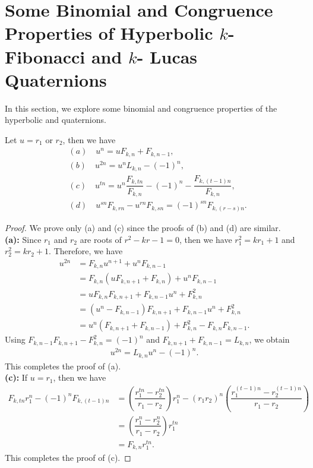 \section{{Some Binomial and Congruence Properties of Hyperbolic $k$- Fibonacci and $k$- Lucas Quaternions}}
In this section, we explore some binomial and congruence properties of the hyperbolic \kF\vspace{.5mm} and \kL\vspace{.5mm} quaternions.
\begin{lemma}
Let $u=r_{1}$ or $r_{2}$, then we have\label{3.1l}
\begin{align*}
&(a)\quad u^n=u{F}_{k,n}+{F}_{k,n-1},\\
&(b)\quad u^{2n}=u^n{L}_{k,n}-(-1)^n,\\
&(c)\quad u^{tn}=u^n\dfrac{{F}_{k,tn}}{{F}_{k,n}}-(-1)^n-\dfrac{{F}_{k,(t-1)n}}{{F}_{k,n}},\\
&(d)\quad u^{sn}{F}_{k,rn}-u^{rn}{F}_{k,sn}=(-1)^{sn}{F}_{k,(r-s)n}.
\end{align*}
\begin{proof}
We prove only (a) and (c) since the proofs of (b) and (d) are similar.\\
\textbf{{(a):}}
Since $r_1$ and $r_2$ are roots of $r^2-kr-1=0$, then we have $r_1^2=kr_1+1$ and $r_2^2=kr_2+1$. Therefore, we have
\begin{align*}
u^{2n}&={F}_{k,n}u^{n+1}+u^n{F}_{k,n-1}\\
&={F}_{k,n}(u{F}_{k,n+1}+{F}_{k,n})+u^n{F}_{k,n-1}\\
&=u{F}_{k,n}{F}_{k,n+1}+{F}_{k,n-1}u^n+{F}_{k,n}^2\\
&=(u^n-{F}_{k,n-1}){F}_{k,n+1}+{F}_{k,n-1}u^n+{F}_{k,n}^2\\
&=u^n({F}_{k,n+1}+{F}_{k,n-1})+{F}_{k,n}^2-{F}_{k,n}F_{k,n-1}.
\end{align*}
Using ${F}_{k,n-1}{F}_{k,n+1}-{F}_{k,n}^2=(-1)^n$ and ${F}_{k,n+1}+{F}_{k,n-1}={L}_{k,n}$, we obtain
\begin{align*}
u^{2n}={L}_{k,n}u^n-(-1)^n.
\end{align*}
This completes the proof of (a).\\
\textbf{{(c):}}
If $u=r_1$, then we have
\begin{align*}
{F}_{k,tn}r_1^n-(-1)^n{F}_{k,(t-1)n}&=(\dfrac{r_1^{tn}-r_2^{tn}}{r_1-r_2})r_1^{n}-(r_1r_2)^n(\dfrac{r_1^{(t-1)n}-r_2^{(t-1)n}}{r_1-r_2})\\
&=(\dfrac{r_1^{n}-r_2^{n}}{r_1-r_2})r_1^{tn}\\
&={F}_{k,n}r_1^{tn}.
\end{align*}
This completes the proof of (c).
\end{proof}
\end{lemma}

